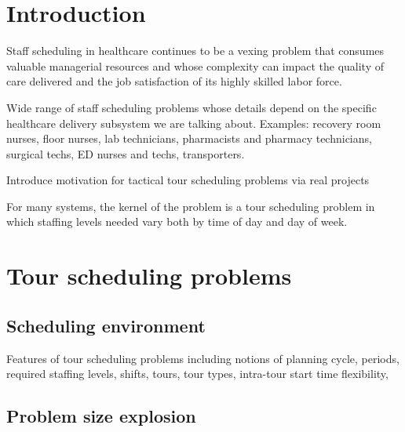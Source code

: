 






\section{Introduction}
\label{sec-intro}
Staff scheduling in healthcare continues to be a vexing problem that consumes valuable managerial resources and whose complexity can impact the quality of care delivered and the job satisfaction of its highly skilled labor force. \cite{}

Wide range of staff scheduling problems whose details depend on the specific healthcare delivery subsystem we are talking about. Examples: recovery room nurses, floor nurses, lab technicians, pharmacists and pharmacy technicians, surgical techs, ED nurses and techs, transporters.

Introduce motivation for tactical tour scheduling problems via real projects

For many systems, the kernel of the problem is a tour scheduling problem in which staffing levels needed vary both by time of day and day of week. 

\section{Tour scheduling problems}

\subsection{Scheduling environment}

Features of tour scheduling problems including notions of planning cycle, periods, required staffing levels, shifts, tours, tour types, intra-tour start time flexibility, 

\subsection{Problem size explosion}

